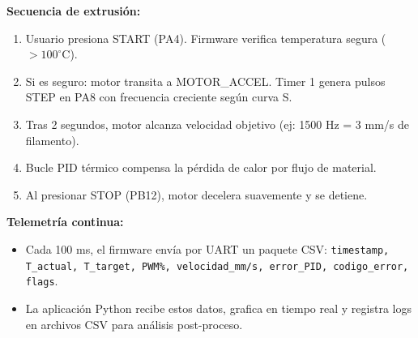 \documentclass[12pt]{article}
\begin{document}
\textbf{Secuencia de extrusión:}
\begin{enumerate}
    \item Usuario presiona START (PA4). Firmware verifica temperatura segura ($>100^{\circ}$C).
    \item Si es seguro: motor transita a MOTOR\_ACCEL. Timer 1 genera pulsos STEP en PA8 con frecuencia creciente según curva S.
    \item Tras 2 segundos, motor alcanza velocidad objetivo (ej: 1500 Hz = 3 mm/s de filamento).
    \item Bucle PID térmico compensa la pérdida de calor por flujo de material.
    \item Al presionar STOP (PB12), motor decelera suavemente y se detiene.
\end{enumerate}

\textbf{Telemetría continua:}
\begin{itemize}
    \item Cada 100 ms, el firmware envía por UART un paquete CSV: \texttt{timestamp, T\_actual, T\_target, PWM\%, velocidad\_mm/s, error\_PID, codigo\_error, flags}.
    \item La aplicación Python recibe estos datos, grafica en tiempo real y registra logs en archivos CSV para análisis post-proceso.
\end{itemize}
\end{document}
